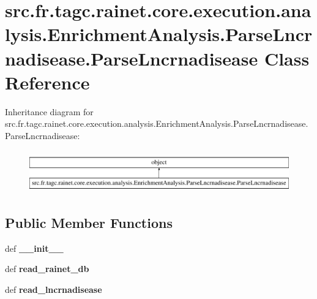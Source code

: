 \hypertarget{classsrc_1_1fr_1_1tagc_1_1rainet_1_1core_1_1execution_1_1analysis_1_1EnrichmentAnalysis_1_1Parsecb1def1c78d4bf507f73f324ea473dbb}{\section{src.\-fr.\-tagc.\-rainet.\-core.\-execution.\-analysis.\-Enrichment\-Analysis.\-Parse\-Lncrnadisease.\-Parse\-Lncrnadisease Class Reference}
\label{classsrc_1_1fr_1_1tagc_1_1rainet_1_1core_1_1execution_1_1analysis_1_1EnrichmentAnalysis_1_1Parsecb1def1c78d4bf507f73f324ea473dbb}
}
Inheritance diagram for src.\-fr.\-tagc.\-rainet.\-core.\-execution.\-analysis.\-Enrichment\-Analysis.\-Parse\-Lncrnadisease.\-Parse\-Lncrnadisease\-:\begin{figure}[H]
\begin{center}
\leavevmode
\includegraphics[height=1.842105cm]{classsrc_1_1fr_1_1tagc_1_1rainet_1_1core_1_1execution_1_1analysis_1_1EnrichmentAnalysis_1_1Parsecb1def1c78d4bf507f73f324ea473dbb}
\end{center}
\end{figure}
\subsection*{Public Member Functions}
\begin{DoxyCompactItemize}
\item 
\hypertarget{classsrc_1_1fr_1_1tagc_1_1rainet_1_1core_1_1execution_1_1analysis_1_1EnrichmentAnalysis_1_1Parsecb1def1c78d4bf507f73f324ea473dbb_a6cb8d97e0a02ea204c9cd3ebebcb6219}{def {\bfseries \-\_\-\-\_\-init\-\_\-\-\_\-}}\label{classsrc_1_1fr_1_1tagc_1_1rainet_1_1core_1_1execution_1_1analysis_1_1EnrichmentAnalysis_1_1Parsecb1def1c78d4bf507f73f324ea473dbb_a6cb8d97e0a02ea204c9cd3ebebcb6219}

\item 
\hypertarget{classsrc_1_1fr_1_1tagc_1_1rainet_1_1core_1_1execution_1_1analysis_1_1EnrichmentAnalysis_1_1Parsecb1def1c78d4bf507f73f324ea473dbb_a447c9388a42d95713edbd79b7ef3c6fb}{def {\bfseries read\-\_\-rainet\-\_\-db}}\label{classsrc_1_1fr_1_1tagc_1_1rainet_1_1core_1_1execution_1_1analysis_1_1EnrichmentAnalysis_1_1Parsecb1def1c78d4bf507f73f324ea473dbb_a447c9388a42d95713edbd79b7ef3c6fb}

\item 
\hypertarget{classsrc_1_1fr_1_1tagc_1_1rainet_1_1core_1_1execution_1_1analysis_1_1EnrichmentAnalysis_1_1Parsecb1def1c78d4bf507f73f324ea473dbb_a8b33d52077852d34a4bb96537adb1279}{def {\bfseries read\-\_\-lncrnadisease}}\label{classsrc_1_1fr_1_1tagc_1_1rainet_1_1core_1_1execution_1_1analysis_1_1EnrichmentAnalysis_1_1Parsecb1def1c78d4bf507f73f324ea473dbb_a8b33d52077852d34a4bb96537adb1279}

\end{DoxyCompactItemize}
